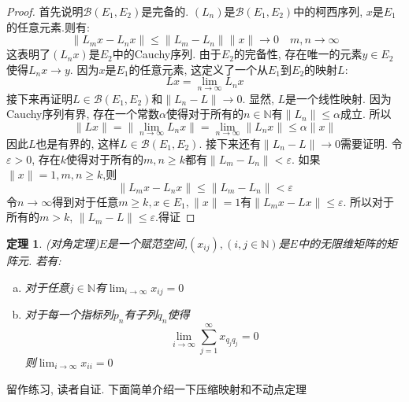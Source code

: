 \documentclass[a4paper,11pt]{article}
\newtheorem{theorem}{\hspace{2em}定理}[section]
\newtheorem{proof}{证明}[section]
\begin{document}
\begin{proof}
  首先说明$\mathcal{B}(E_1,E_2)$是完备的. $(L_n)$是$\mathcal{B}(E_1,E_2)$中的柯西序列, $x$是$E_1$的任意元素.则有:
  \begin{equation*}
    \|L_mx-L_nx\|\leq\|L_m-L_n\|\|x\|\to 0\quad m,n\to\infty
  \end{equation*}
  这表明了$(L_nx)$是$E_2$中的Cauchy序列. 由于$E_2$的完备性, 存在唯一的元素$y\in E_2$使得$L_nx\to y$. 因为$x$是$E_1$的任意元素, 这定义了一个从$E_1$到$E_2$的映射$L$:
  \begin{equation*}
    Lx=\lim_{n\to\infty}L_nx
  \end{equation*}
  接下来再证明$L\in\mathcal{B}(E_1,E_2)$和$\|L_n-L\|\to 0$.
  显然, $L$是一个线性映射. 因为Cauchy序列有界, 存在一个常数$\alpha$使得对于所有的$n\in \mathbb{N}$有$\|L_n\|\leq\alpha$成立. 所以
  \begin{equation*}
    \|Lx\|=\|\lim_{n\to\infty}L_nx\|=\lim_{n\to\infty}\|L_nx\|\leq\alpha\|x\|
  \end{equation*}
  因此$L$也是有界的, 这样$L\in\mathcal{B}(E_1,E_2)$. 接下来还有$\|L_n-L\|\to0$需要证明. 令$\varepsilon>0$, 存在$k$使得对于所有的$m,n\geq k$都有$\|L_m-L_n\|<\varepsilon$. 如果$\|x\|=1,m,n\geq k$,则
  \begin{equation*}
    \|L_mx-L_nx\|\leq\|L_m-L_n\|<\varepsilon
  \end{equation*}
  令$n\to\infty$得到对于任意$m\geq k,x\in E_1,\|x\|=1$有$\|L_mx-Lx\|\leq\varepsilon$. 所以对于所有的$m>k$, $\|L_m-L\|\leq\varepsilon$.得证
\end{proof}
\begin{theorem}
  (对角定理)$E$是一个赋范空间,$(x_{ij}),(i,j\in \mathbb{N})$是$E$中的无限维矩阵的矩阵元. 若有:
  \begin{enumerate}[(a)]
    \item 对于任意$j\in \mathbb{N}$有$\lim_{i\to\infty}x_{ij}=0$
    \item 对于每一个指标列$p_n$有子列$q_n$使得
    \begin{equation*}
      \lim_{i\to\infty}\sum_{j=1}^{\infty}x_{q_jq_j}=0
    \end{equation*}
    则$\lim_{i\to\infty}x_{ii}=0$
  \end{enumerate}
\end{theorem}
留作练习, 读者自证. 下面简单介绍一下压缩映射和不动点定理
\end{document}
